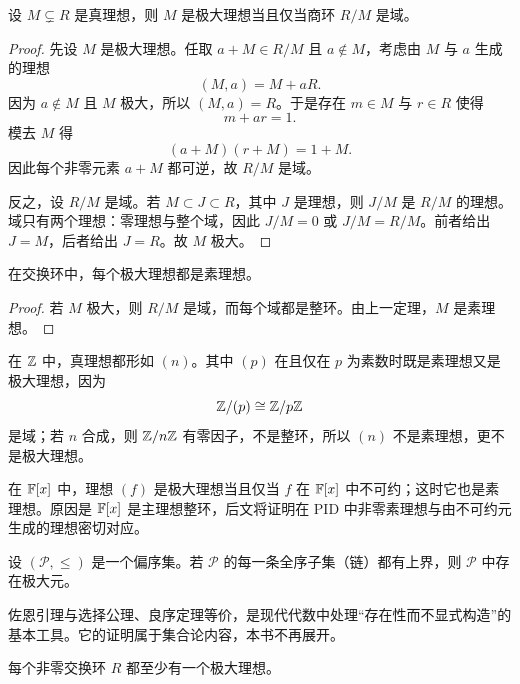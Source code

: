 \begin{theorem}
设 $M\subsetneq R$ 是真理想，则 $M$ 是极大理想当且仅当商环 $R/M$ 是域。
\end{theorem}

\begin{proof}
先设 $M$ 是极大理想。任取 $a+M\in R/M$ 且 $a\notin M$，考虑由 $M$ 与 $a$ 生成的理想
\[
(M,a)=M+aR.
\]
因为 $a\notin M$ 且 $M$ 极大，所以 $(M,a)=R$。于是存在 $m\in M$ 与 $r\in R$ 使得
\[
m+ar=1.
\]
模去 $M$ 得
\[
(a+M)(r+M)=1+M.
\]
因此每个非零元素 $a+M$ 都可逆，故 $R/M$ 是域。

反之，设 $R/M$ 是域。若 $M\subset J\subset R$，其中 $J$ 是理想，则 $J/M$ 是 $R/M$ 的理想。域只有两个理想：零理想与整个域，因此 $J/M=0$ 或 $J/M=R/M$。前者给出 $J=M$，后者给出 $J=R$。故 $M$ 极大。
\end{proof}

\begin{corollary}
在交换环中，每个极大理想都是素理想。
\end{corollary}

\begin{proof}
若 $M$ 极大，则 $R/M$ 是域，而每个域都是整环。由上一定理，$M$ 是素理想。
\end{proof}

\begin{example}
在 $\mathbb{Z}$ 中，真理想都形如 $(n)$。其中 $(p)$ 在且仅在 $p$ 为素数时既是素理想又是极大理想，因为
\[
\mathbb{Z}/(p)\cong \mathbb{Z}/p\mathbb{Z}
\]
是域；若 $n$ 合成，则 $\mathbb{Z}/n\mathbb{Z}$ 有零因子，不是整环，所以 $(n)$ 不是素理想，更不是极大理想。
\end{example}

\begin{example}
在 $\mathbb{F}[x]$ 中，理想 $(f)$ 是极大理想当且仅当 $f$ 在 $\mathbb{F}[x]$ 中不可约；这时它也是素理想。原因是 $\mathbb{F}[x]$ 是主理想整环，后文将证明在 PID 中非零素理想与由不可约元生成的理想密切对应。
\end{example}

\begin{theorem}[佐恩引理]
设 $(\mathcal{P},\le)$ 是一个偏序集。若 $\mathcal{P}$ 的每一条全序子集（链）都有上界，则 $\mathcal{P}$ 中存在极大元。
\end{theorem}

\begin{remark}
佐恩引理与选择公理、良序定理等价，是现代代数中处理“存在性而不显式构造”的基本工具。它的证明属于集合论内容，本书不再展开。
\end{remark}

\begin{theorem}
每个非零交换环 $R$ 都至少有一个极大理想。
\end{theorem}

